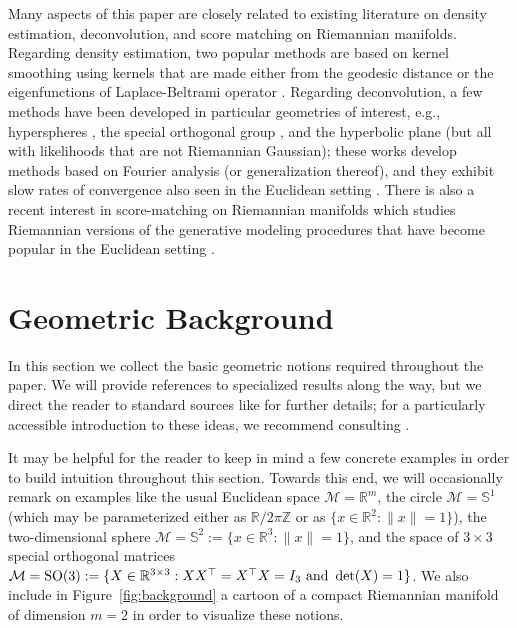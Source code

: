 \documentclass[preprint]{imsart}
\theoremstyle{plain}
\theoremstyle{definition}
\newcommand{\Rbb}{\mathbb{R}}
\newcommand{\Zbb}{\mathbb{Z}}
\newcommand{\Mcal}{\mathcal{M}}
\DeclareMathOperator{\SO}{SO}
\begin{document}
Many aspects of this paper are closely related to existing literature on density estimation, deconvolution, and score matching on Riemannian manifolds.
Regarding density estimation, two popular methods are based on kernel smoothing using kernels that are made either from the geodesic distance \cite{Pelletier, HenryRodriguez} or the eigenfunctions of Laplace-Beltrami operator \cite{Hendriks1990}.
Regarding deconvolution, a few methods have been developed in particular geometries of interest, e.g., hyperspheres \cite{HealyKim}, the special orthogonal group \cite{Kim}, and the hyperbolic plane \cite{MobiusDeconvolution} (but all with likelihoods that are not Riemannian Gaussian); these works develop methods based on Fourier analysis (or generalization thereof), and they exhibit slow rates of convergence also seen in the Euclidean setting \cite{FanDeconvolution}.
There is also a recent interest in score-matching on Riemannian manifolds \cite{de2022riemannian} which studies Riemannian versions of the generative modeling procedures that have become popular in the Euclidean setting \cite{vincent2011connection, hyvarinen2005}.

\section{Geometric Background}
\label{subsec:background}

In this section we collect the basic geometric notions required throughout the paper.
We will provide references to specialized results along the way, but we direct the reader to standard sources like \cite{Aubin, Chavel,Petersen} for further details; for a particularly accessible introduction to these ideas, we recommend consulting \cite{SommerFletcherPennec,Boumal}.

It may be helpful for the reader to keep in mind a few concrete examples in order to build intuition throughout this section.
Towards this end, we will occasionally remark on examples like the usual Euclidean space $\Mcal=\Rbb^m$, the circle $\Mcal=\mathbb{S}^1$ (which may be parameterized either as $\Rbb/2\pi\Zbb$ or as $\{x\in\Rbb^2: \|x\|=1\}$), the two-dimensional sphere $\Mcal=\mathbb{S}^2:=\{x\in\Rbb^3: \|x\|=1\}$, and the space of $3\times 3$ special orthogonal matrices $\Mcal=\SO(3):=\{X\in\Rbb^{3\times 3}: XX^{\top} = X^{\top}X = I_3 \textnormal{ and } \det(X)=1\}$.
We also include in Figure~\ref{fig:background} a cartoon of a compact Riemannian manifold of dimension $m=2$ in order to visualize these notions.
\end{document}

